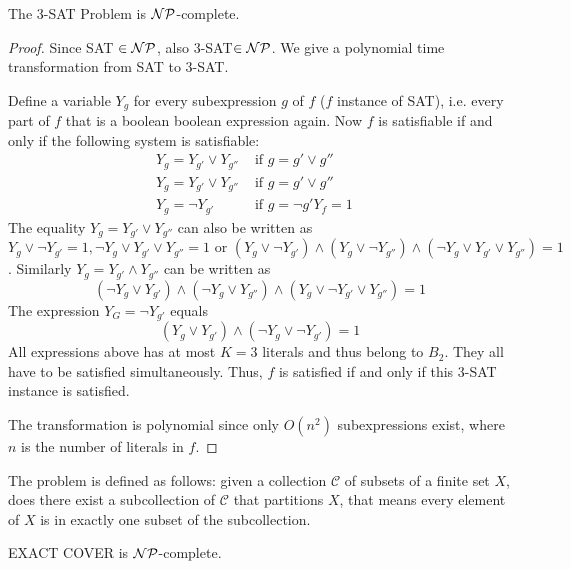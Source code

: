 \begin{cor}
The 3-SAT Problem is $\mathcal{NP}$-complete.
\end{cor}
\begin{proof}
	Since SAT $\in \mathcal{NP}$, also 3-SAT$\in \mathcal{NP}$. We give a polynomial time transformation from SAT to 3-SAT.
	
Define a variable $Y_g$ for every subexpression $g$ of $f$ ($f$ instance of SAT), i.e. every part of $f$ that is a boolean boolean expression again.
Now $f$ is satisfiable if and only if the following system is satisfiable: 
\begin{align*}
	Y_g = Y_{g'} \vee Y_{g''} & \text{ if } g = g' \vee g'' \\
	Y_g = Y_{g'} \vee Y_{g''}& \text{ if } g = g' \vee g'' \\
	Y_g = \neg Y_{g'}& \text{ if } g = \neg g'
	Y_f = 1 &
\end{align*}
The equality $Y_g = Y_{g'} \vee Y_{g''}$ can also be written as 
\[
	Y_{g} \vee \neg Y_{g'} = 1, \neg Y_g \vee Y_{g'} \vee Y_{g''} = 1 \text{ or } (Y_g\vee\neg Y_{g'})\wedge(Y_g\vee \neg Y_{g''}) \wedge(\neg Y_g \vee Y_{g'} \vee Y_{g''}) = 1 \]. Similarly $Y_g=Y_{g'}\wedge Y_{g''}$ can be written as \[
	(\neg Y_g \vee Y_{g'}) \wedge (\neg Y_g \vee Y_{g''}) \wedge (Y_g \vee \neg Y_{g'} \vee Y_{g''}) = 1
\]
The expression $Y_G = \neg Y_{g'}$ equals \[
	(Y_g \vee Y_{g'}) \wedge (\neg Y_g \vee \neg Y_{g'}) = 1
\]
All expressions above has at most $K=3$ literals and thus belong to $B_2$. They all have to be satisfied simultaneously. Thus, $f$ is satisfied if and only if this 3-SAT instance is satisfied.

The transformation is polynomial since only $O(n^2)$ subexpressions exist, where $n$ is the number of literals in $f$.
\end{proof}

\begin{defn}
	The  problem is defined as follows: given a collection $\mathcal C$ of subsets of a finite set $X$, does there exist a subcollection of $\mathcal C$ that partitions $X$, that means every element of $X$ is in exactly one subset of the subcollection.
\end{defn}

\begin{thm}
	EXACT COVER is $\mathcal{NP}$-complete.
\end{thm}

